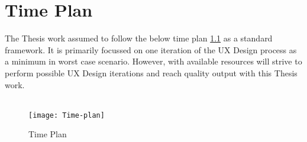\chapter{Time Plan}
\label{ch:timeplan}

The Thesis work assumed to follow the below time plan \ref{fig:time-plan} as a standard framework. It is primarily focussed on one iteration of the UX Design process as a minimum in worst case scenario. However, with available resources will strive to perform possible UX Design iterations and reach quality output with this Thesis work. \\ \\

\begin{figure}[h]
	\texttt{[image: Time-plan]}
	\centering
	\caption{Time Plan}
	\label{fig:time-plan}
\end{figure}
